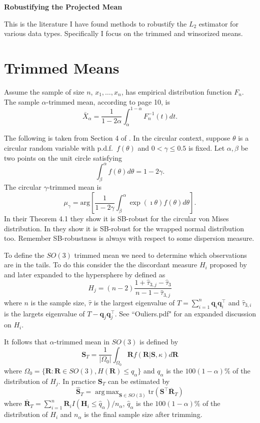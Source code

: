 \documentclass{article}\usepackage[]{graphicx}\usepackage[]{color}
\DeclareMathOperator*{\argmax}{arg\,max}
\newcommand{\TrimMean}{{\widehat{\bm S}_T}}
\begin{document}
\begin{center}
\Large{\bf Robustifying the Projected Mean}
\end{center}
\normalsize
This is the literature I have found methods to robustify the $L_2$ estimator for various data types.  Specifically I focus on the trimmed and winsorized means.



 
\section{Trimmed Means}

Assume the sample of size $n$, $x_1,\dots,x_n$, has empirical distribution function $F_n$.  The sample $\alpha$-trimmed mean, according to \cite{huber2009} page 10, is
\[
\bar{X}_\alpha=\frac{1}{1-2\alpha}\int_{\alpha}^{1-\alpha}F_n^{-1}(t)dt.
\]

The following is taken from Section 4 of \cite{laha2011}. In the circular context, suppose $\theta$ is a circular random variable with p.d.f.~$f(\theta)$ and $0<\gamma\leq 0.5$ is fixed.  Let $\alpha,\beta$ be two points on the unit circle satisfying
\[
\int_{\beta}^\alpha f(\theta)d\theta=1-2\gamma.
\] 
The circular $\gamma$-trimmed mean is
\[
\mu_\gamma=\text{arg}\left[\frac{1}{1-2\gamma}\int^{\alpha}_\beta\exp(\imath\theta)f(\theta)d\theta\right].
\]
In their Theorem 4.1 they show it is SB-robust for the circular von Mises distribution.  In \cite{laha2013} they show it is SB-robust for the wrapped normal distribution too.  Remember SB-robustness is always with respect to some dispersion measure.


To define the $SO(3)$ trimmed mean we need to determine which observations are in the tails.  To do this consider the the discordant measure $H_i$ proposed by \cite{best1986} and later expanded to the hypersphere by \cite{figueiredo2005} defined as 
\begin{equation}\label{eqn:Hj}
H_j=(n-2)\frac{1+\hat\tau_{3,j}-\hat\tau_3}{n-1-\hat\tau_{3,j}}
\end{equation}
where $n$ is the sample size, $\hat{\tau}$ is the largest eigenvalue of $T=\sum_{i=1}^n\bm q_i\bm q_i^\top$ and $\hat\tau_{3,i}$ is the largets eigenvalue of $T-\bm q_j\bm q_j^\top$.  See ``Ouliers.pdf" for an expanded discussion on $H_i$.

It follows that $\alpha$-trimmed mean in $SO(3)$ is defined by
\[
\bm S_{T}=\frac{1}{|\Omega_0|}\int_{\Omega_0}\bm Rf(\bm R|\bm S,\kappa)d\bm R
\]
where $\Omega_0=\{\bm R:\bm R\in SO(3), H(\bm R)\leq q_{\alpha}\}$ and $q_\alpha$ is the $100(1-\alpha)\%$ of the distribution of $H_j$.  In practice $\bm S_T$ can be estimated by
\[
\TrimMean=\argmax_{\bm S\in SO(3)}\text{tr}(\bm S^\top\overline{\bm R}_T)
\]
where $\overline{\bm R}_T=\sum_{i=1}^n\bm R_iI(\bm H_i\leq \hat q_{\alpha})/n_\alpha$, $\hat q_{\alpha}$ is the $100(1-\alpha)\%$ of the distribution of $H_i$ and $n_\alpha$ is the final sample size after trimming.
\end{document}

